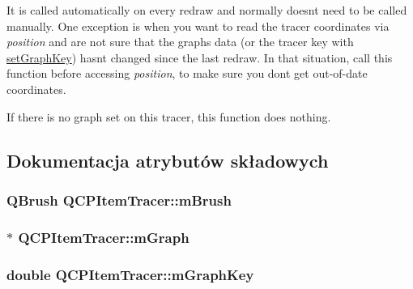 It is called automatically on every redraw and normally doesn\textquotesingle{}t need to be called manually. One exception is when you want to read the tracer coordinates via {\itshape position} and are not sure that the graph\textquotesingle{}s data (or the tracer key with \hyperlink{class_q_c_p_item_tracer_a6840143b42f3b685cedf7c6d83a704c8}{set\+Graph\+Key}) hasn\textquotesingle{}t changed since the last redraw. In that situation, call this function before accessing {\itshape position}, to make sure you don\textquotesingle{}t get out-\/of-\/date coordinates.

If there is no graph set on this tracer, this function does nothing. 

\subsection{Dokumentacja atrybutów składowych}
\subsubsection[{\texorpdfstring{m\+Brush}{mBrush}}]{\setlength{\rightskip}{0pt plus 5cm}Q\+Brush Q\+C\+P\+Item\+Tracer\+::m\+Brush\hspace{0.3cm}{\ttfamily [protected]}}\hypertarget{class_q_c_p_item_tracer_a6597be63a17a266233941354200b2340}{}\label{class_q_c_p_item_tracer_a6597be63a17a266233941354200b2340}
\subsubsection[{\texorpdfstring{m\+Graph}{mGraph}}]{$\ast$ Q\+C\+P\+Item\+Tracer\+::m\+Graph\hspace{0.3cm}{\ttfamily [protected]}}\hypertarget{class_q_c_p_item_tracer_a2d70cf616b579563aa15f796dfc143ac}{}\label{class_q_c_p_item_tracer_a2d70cf616b579563aa15f796dfc143ac}
\subsubsection[{\texorpdfstring{m\+Graph\+Key}{mGraphKey}}]{\setlength{\rightskip}{0pt plus 5cm}double Q\+C\+P\+Item\+Tracer\+::m\+Graph\+Key\hspace{0.3cm}{\ttfamily [protected]}}\hypertarget{class_q_c_p_item_tracer_a8fa20f2e9ee07d21fd7c8d30ba4702ca}{}\label{class_q_c_p_item_tracer_a8fa20f2e9ee07d21fd7c8d30ba4702ca}
